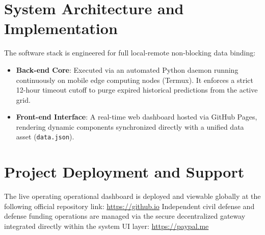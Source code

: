 \documentclass[10pt,journal,compsoc]{IEEEtran}
\begin{document}
\section{System Architecture and Implementation}
The software stack is engineered for full local-remote non-blocking data binding:
\begin{itemize}
    \item \textbf{Back-end Core}: Executed via an automated Python daemon running continuously on mobile edge computing nodes (Termux). It enforces a strict 12-hour timeout cutoff to purge expired historical predictions from the active grid.
    \item \textbf{Front-end Interface}: A real-time web dashboard hosted via GitHub Pages, rendering dynamic components synchronized directly with a unified data asset (\texttt{data.json}).
\end{itemize}

\section{Project Deployment and Support}
The live operating operational dashboard is deployed and viewable globally at the following official repository link:
\newline
\url{https://github.io}
\newline
\newline
Independent civil defense and defense funding operations are managed via the secure decentralized gateway integrated directly within the system UI layer:
\newline
\url{https://paypal.me}
\end{document}
